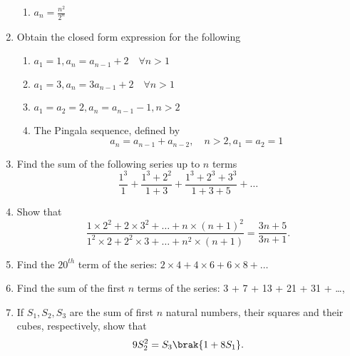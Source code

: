 \begin{enumerate}[label=\thesubsection.\arabic*,ref=\thesubsection.\theenumi]
\begin{enumerate}
\item $a_n = \frac{n^2}{2^n}$
\end{enumerate}
\item Obtain the closed form expression for the following
\begin{enumerate}
\item $a_1 = 1, a_n = a_{n-1}+2 \quad \forall n > 1$
\item $a_1 = 3, a_n = 3a_{n-1}+2 \quad \forall n > 1$
\item $a_1 = a_2 = 2, a_n = a_{n-1}-1, n > 2$ 
\item The Pingala sequence, defined by $$a_n = a_{n-1}+a_{n-2}, \quad n>2,  a_1 = a_2=1$$ 
\end{enumerate}
\item Find the sum of the following series up to $n$ terms
$$\frac{1^3}{1}+\frac{1^3+2^2}{1+3}+\frac{1^3+2^3+3^3}{1+3+5}+\dots$$
\item Show that $$\frac{1 \times 2^2+ 2 \times 3^2+\dots+n \times (n+1)^2}{1^2 \times 2 + 2^2 \times 3 +\dots+n^2 \times (n+1)} = \frac{3n+5}{3n+1}.$$
\item Find the $20^{th}$ term of the series: $2 \times 4 + 4 \times 6 + 6 \times 8 + \dots  $ 
\item Find the sum of the first $n$ terms of the series: 3 + 7 + 13 + 21 + 31 + \dots, 
\item If $S_1, S_2, S_3$ are the sum of first $n$ natural numbers, their squares and their cubes, respectively, show that $$9 S_2^2 = S_3 \brak{1 + 8S_1}.$$
\end{enumerate}
